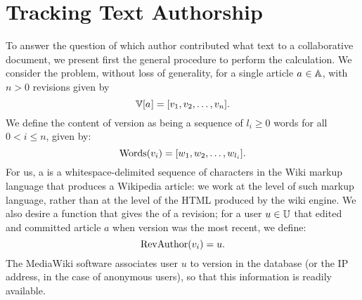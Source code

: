 \section{Tracking Text Authorship}
\label{sec:diff-tracking}

To answer the question of which author contributed what text to a
collaborative document, we present first the general procedure to
perform the calculation.
We consider the problem, without loss of generality, for
a single article $a_{} \in \mathbb{A}$,
with $n > 0$ revisions given by
\begin{equation*}
\versions{\article{}} = [ \version{1}, \version{2}, \ldots, \version{n} ].
\end{equation*}
We define the content of version 
as being a sequence of $l_i \ge 0$ words for all $0 < i \le n$,
given by:
\begin{equation}
\words{\version{i}} = [ w_1, w_2, \ldots, w_{l_i} ].
\label{def:words}
\end{equation}
For us, a  is a whitespace-delimited sequence of
characters in the Wiki markup language that produces a Wikipedia article:
we work at the level of such markup language, rather than at the level
of the HTML produced by the wiki engine.
We also desire a function that gives the  of a
revision; for a user $u \in \mathbb{U}$
that edited and committed article $a$ when version 
was the most recent, we define:
\begin{equation}
\revauthor{\version{i}} = u.
\label{def:revauthor}
\end{equation}
The MediaWiki software associates user $u$ to version  in
the database (or the IP address, in the case of anonymous users),
so that this information is readily available.




